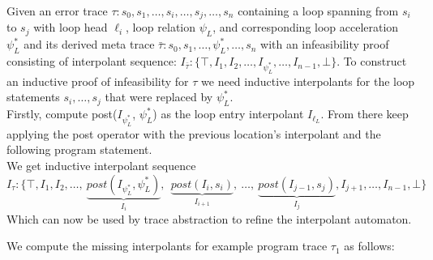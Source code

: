 \documentclass{article}
\newcounter{example}[section]
\newcommand\mycom[1]{}
\newcommand\mycom[1]{#1}
\newcommand{\ts}[1]{\mycom{\todo[color=green!40,inline]{\small TS: #1}}}
\begin{document}
    Given an error trace $\tau: s_0, s_1, \ldots , s_i, \ldots , s_j, \ldots , s_n$ containing a loop spanning from $s_i$ to $s_j$ with loop head $\ell_i$, loop relation $\psi_L$, and corresponding loop acceleration $\psi^*_{L}$ and its derived meta trace $\bar{\tau}: s_0, s_1, \ldots, \psi^*_{L}, \ldots , s_n$ with an infeasibility proof consisting of interpolant sequence: $I_{\bar{\tau}}: \{\top, I_1, I_2, \ldots , I_{\psi^*_{L}}, \ldots , I_{n-1}, \bot \}$. 
    To construct an inductive proof of infeasibility for $\tau$ we need inductive interpolants for the loop statements $s_i, \ldots , s_j$ that were replaced by $\psi^*_{L}$. \\
    Firstly, compute post($I_{\psi^*_L}$, $\psi^*_L$) as the loop entry interpolant $I_{\ell_L}$. From there keep applying the post operator with the previous location's interpolant and the following program statement. \\
    We get inductive interpolant sequence
    \begin{equation*}
        I_\tau: \{\top,I_1,I_2, \ldots ,\ \underbrace{post(I_{\psi^*_L}, \psi^*_L)}_{I_{i}},\ \ \underbrace{post(I_{i}, s_i)}_{I_{i+1}},\ \ldots ,\ \underbrace{post(I_{j-1}, s_j)}_{I_{j}},I_{j+1}, \ldots ,I_{n-1}, \bot \}
    \end{equation*}
    Which can now be used by trace abstraction to refine the interpolant automaton.
    \ts{Explain why this works and why it is necessary.}

We compute the missing interpolants for example program trace $\tau_1$ as follows:
\end{document}
